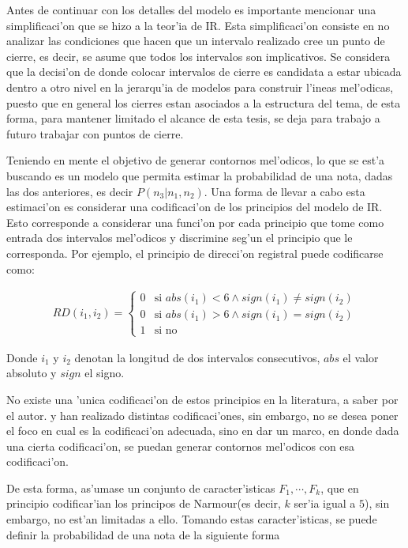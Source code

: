 Antes de continuar con los detalles del modelo es importante mencionar una simplificaci'on que se hizo a la teor'ia de IR.
Esta simplificaci'on consiste en no analizar las condiciones que hacen que un intervalo realizado
cree un punto de cierre, es decir, se asume que todos los intervalos son implicativos. Se considera que la decisi'on de donde colocar intervalos de cierre es candidata 
a estar ubicada dentro a otro nivel en la jerarqu'ia de modelos para construir l'ineas mel'odicas, puesto que en general los cierres estan asociados a la estructura
del tema, de esta forma, para mantener limitado el alcance de esta tesis, se deja para trabajo a futuro trabajar con puntos de cierre.

Teniendo en mente el objetivo de generar contornos mel'odicos, lo que se est'a buscando es un modelo que permita estimar la probabilidad de una nota, 
dadas las dos anteriores, es decir $P(n_3|n_1, n_2)$. Una forma de llevar a cabo esta estimaci'on es considerar una codificaci'on de los principios del modelo de IR.
Esto corresponde a considerar una funci'on por cada principio que tome como entrada dos intervalos mel'odicos y discrimine seg'un el principio que le corresponda. Por ejemplo,
el principio de direcci'on registral puede codificarse como:

\begin{align*}
RD(i_1, i_2)= \left\{
 \begin{array}{rl}
  0 & \text{si } abs(i_1) < 6 \land sign(i_1) \ne sign(i_2) \\
  0 & \text{si } abs(i_1) > 6 \land sign(i_1) = sign(i_2) \\
  1 & \text{si no}
 \end{array} \right.
\end{align*}

Donde $i_1$ y $i_2$ denotan la longitud de dos intervalos consecutivos, $abs$ el valor absoluto y $sign$ el signo.

No existe una 'unica codificaci'on de estos principios en la literatura, a saber por el autor. \cite{PaieThesis} y \cite{Schellenberg97} han realizado distintas 
codificaci'ones, sin embargo, no se desea poner el foco en cual es la codificaci'on adecuada, sino en dar un marco, en donde dada una cierta codificaci'on, 
se puedan generar contornos mel'odicos con esa codificaci'on.

De esta forma, as'umase un conjunto de caracter'isticas $F_1, \cdots, F_k$, que en principio codificar'ian los principos de Narmour(es decir, $k$ ser'ia igual a $5$), 
sin embargo, no est'an limitadas a ello. Tomando estas caracter'isticas, se puede definir la probabilidad de una nota de la siguiente forma

